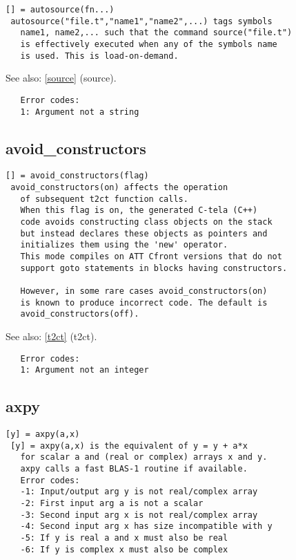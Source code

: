 \documentclass[a4paper]{article}
\begin{document}
\begin{tscreen}
\begin{verbatim}
[] = autosource(fn...)
 autosource("file.t","name1","name2",...) tags symbols
   name1, name2,... such that the command source("file.t")
   is effectively executed when any of the symbols name
   is used. This is load-on-demand.
\end{verbatim}

See also: \ref{source} {(source)}.
\begin{verbatim}
   Error codes:
   1: Argument not a string 
\end{verbatim}
\end{tscreen}





\subsection{avoid\_constructors\label{avoid_constructors}}

\begin{tscreen}
\begin{verbatim}
[] = avoid_constructors(flag)
 avoid_constructors(on) affects the operation
   of subsequent t2ct function calls.
   When this flag is on, the generated C-tela (C++)
   code avoids constructing class objects on the stack
   but instead declares these objects as pointers and
   initializes them using the 'new' operator.
   This mode compiles on ATT Cfront versions that do not
   support goto statements in blocks having constructors.

   However, in some rare cases avoid_constructors(on)
   is known to produce incorrect code. The default is
   avoid_constructors(off).
\end{verbatim}

See also: \ref{t2ct} {(t2ct)}.
\begin{verbatim}
   Error codes:
   1: Argument not an integer
\end{verbatim}
\end{tscreen}





\subsection{axpy\label{axpy}}

\begin{tscreen}
\begin{verbatim}
[y] = axpy(a,x)
 [y] = axpy(a,x) is the equivalent of y = y + a*x
   for scalar a and (real or complex) arrays x and y.
   axpy calls a fast BLAS-1 routine if available.
   Error codes:
   -1: Input/output arg y is not real/complex array
   -2: First input arg a is not a scalar
   -3: Second input arg x is not real/complex array
   -4: Second input arg x has size incompatible with y
   -5: If y is real a and x must also be real
   -6: If y is complex x must also be complex
\end{verbatim}
\end{tscreen}
\end{document}
